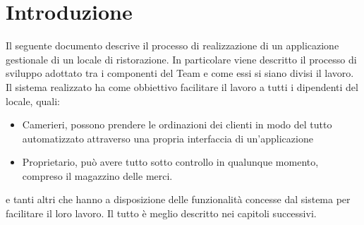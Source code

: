 \chapter{Introduzione}
Il seguente documento descrive il processo di realizzazione di un applicazione gestionale di un locale di ristorazione. In particolare viene descritto il processo di sviluppo adottato tra i componenti del Team e come essi si siano divisi il lavoro.
\\Il sistema realizzato ha come obbiettivo facilitare il lavoro a tutti i dipendenti del locale, quali:
\begin{itemize}
	\item Camerieri, possono prendere le ordinazioni dei clienti in modo del tutto automatizzato attraverso una propria interfaccia di un'applicazione
	\item Proprietario, può avere tutto sotto controllo in qualunque momento, compreso il magazzino delle merci.
\end{itemize}
e tanti altri che hanno a disposizione delle funzionalità concesse dal sistema per facilitare il loro lavoro. Il tutto è meglio descritto nei capitoli successivi. 